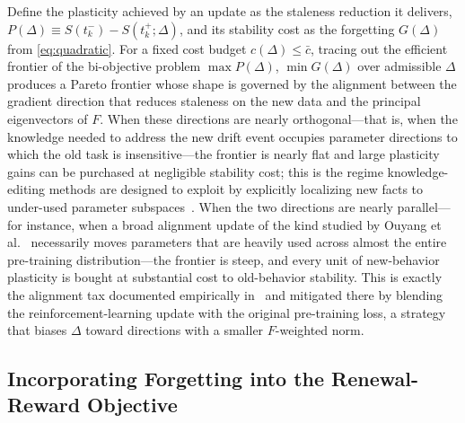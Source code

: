 \documentclass[electronics,article,submit,pdftex,moreauthors]{Definitions/mdpi}
\newcommand{\D}{\varDelta}                 %
\newcommand{\tkm}{t_k^{-}}
\newcommand{\tkp}{t_k^{+}}
\begin{document}
Define the plasticity achieved by an update as the staleness reduction it delivers, $P(\D)\equiv S(\tkm)-S(\tkp;\D)$, and its stability cost as the forgetting $G(\D)$ from \eqref{eq:quadratic}. For a fixed cost budget $c(\D)\le\bar{c}$, tracing out the efficient frontier of the bi-objective problem $\max P(\D)$, $\min G(\D)$ over admissible $\D$ produces a Pareto frontier whose shape is governed by the alignment between the gradient direction that reduces staleness on the new data and the principal eigenvectors of $F$. When these directions are nearly orthogonal---that is, when the knowledge needed to address the new drift event occupies parameter directions to which the old task is insensitive---the frontier is nearly flat and large plasticity gains can be purchased at negligible stability cost; this is the regime knowledge-editing methods are designed to exploit by explicitly localizing new facts to under-used parameter subspaces~\cite{WangS2024,Zhang2024}. When the two directions are nearly parallel---for instance, when a broad alignment update of the kind studied by Ouyang et al.~\cite{Ouyang2022} necessarily moves parameters that are heavily used across almost the entire pre-training distribution---the frontier is steep, and every unit of new-behavior plasticity is bought at substantial cost to old-behavior stability. This is exactly the alignment tax documented empirically in~\cite{Ouyang2022} and mitigated there by blending the reinforcement-learning update with the original pre-training loss, a strategy that biases $\D$ toward directions with a smaller $F$-weighted norm.

\subsection{Incorporating Forgetting into the Renewal-Reward Objective}\label{sec:forgetrenewal}
\end{document}
